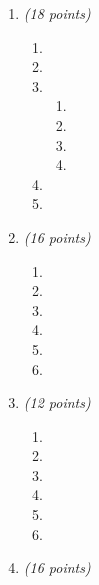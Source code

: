 \documentclass[a4paper,11pt]{article}
\begin{document}
\begin{enumerate}
\begin{enumerate}
      \item
      \item
    \end{enumerate}
    \item \textit{(18 points)}
    \begin{enumerate}
      \item
      \item
      \item
      \begin{enumerate}
        \item
        \item
        \item
        \item
      \end{enumerate}
      \item
      \item
    \end{enumerate}
    \item \textit{(16 points)}
    \begin{enumerate}
      \item
      \item
      \item
      \item
      \item
      \item
    \end{enumerate}
    \item \textit{(12 points)}
    \begin{enumerate}
      \item
      \item
      \item
      \item
      \item
      \item
    \end{enumerate}
    \item \textit{(16 points)}

\end{enumerate}
\end{document}
